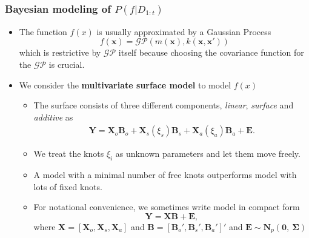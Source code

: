 \documentclass[11pt]{beamer}
\begin{document}
\begin{frame}[allowframebreaks]
  \frametitle{Bayesian modeling of $P (f|D_{1:t} )$}
  \begin{itemize}
  \item The function $f(x)$ is usually approximated by a Gaussian
    Process \citep{mockus1994application, sasena2002flexibility}
    \begin{equation*}
      f(\bm{x})=\mathcal{GP}(m(\bm{x}),k(\bm{x},\bm{x}'))
    \end{equation*}
    which is restrictive by $\mathcal{GP}$ itself because choosing the
    covariance function for the $\mathcal{GP}$ is crucial.

  \item We consider the \textbf{multivariate surface model}
    \citep{li2013efficient} to model $f(x)$

    \begin{itemize}
    \item The surface consists of three different components,
      {\color{blue}\emph{linear}}, {\color{blue}\emph{surface}} and
      {\color{blue}\emph{additive}} as
      \[\begin{gathered}
        \bm{Y}=\bm{X}_o\bm{B}_o+
        \bm{X}_s(\xi_s)\bm{B}_s+\bm{X}_a(\xi_a)\bm{B}_a + \bm{E}.
      \end{gathered}\]
    \item We treat the knots $\xi_i$ as unknown parameters and let them move
      freely.
    \item A model with a minimal number of free knots outperforms model with lots
      of fixed knots.
    \item For notational convenience, we sometimes write model in compact form
      \[
      \bm{Y}=\bm{X}\bm{B}+\bm{E},
      \]
      where $\bm{X}=[\bm{X}_{o},\bm{X}_{s},\bm{X}_{a}]$ and
      $\bm{B}=[{\bm{B}_{o}}',{\bm{B}_{s}}',{\bm{B}_{a}}']'$ and $\bm{E}\sim \bm{N}_p(\bm{0},~\bm{\Sigma})$
    \end{itemize}

  \end{itemize}

\end{frame}
\end{document}
